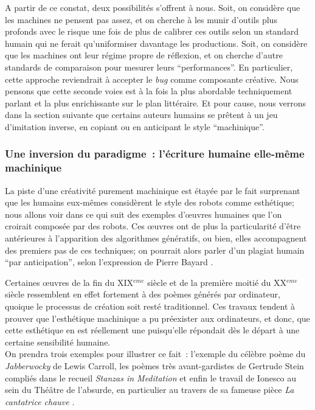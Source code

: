 \documentclass{article}
\begin{document}
					A partir de ce constat, deux possibilités s'offrent à nous. Soit, on considère que les machines ne pensent pas assez, et on cherche à les munir d'outils plus profonds avec le risque une fois de plus de calibrer ces outils selon un standard humain qui ne ferait qu'uniformiser davantage les productions. Soit, on considère que les machines ont leur régime propre de réflexion, et on cherche d'autre standards de comparaison pour mesurer leurs ``performances''. En particulier, cette approche reviendrait à accepter le \textit{bug} comme composante créative. Nous pensons que cette seconde voies est à la fois la plus abordable techniquement parlant et la plus enrichissante sur le plan littéraire. Et pour cause, nous verrons dans la section suivante que certains auteurs humains se prêtent à un jeu d'imitation inverse, en copiant ou en anticipant le style ``machinique''.
					
			\subsubsection{Une inversion du paradigme~: l'écriture humaine elle-même machinique} \label{inversion_paradigme}
				La piste d'une créativité purement machinique est étayée par le fait surprenant que les humains eux-mêmes considèrent le style des robots comme esthétique; nous allons voir dans ce qui suit des exemples d'œuvres humaines que l'on croirait composée par des robots. Ces œuvres ont de plus la particularité d'être antérieures à l'apparition des algorithmes génératifs, ou bien, elles accompagnent des premiers pas de ces techniques; on pourrait alors parler d'un plagiat humain ``par anticipation'', selon l'expression de Pierre Bayard \cite{bayard2002}.
				
				Certaines œuvres de la fin du XIX$^{eme}$ siècle et de la première moitié du XX$^{eme}$ siècle ressemblent en effet fortement à des poèmes générés par ordinateur, quoique le processus de création soit resté traditionnel. Ces travaux tendent à prouver que l'esthétique machinique a pu préexister aux ordinateurs, et donc, que cette esthétique en est réellement une puisqu'elle répondait dès le départ à une certaine sensibilité humaine.\\
				On prendra trois exemples pour illustrer ce fait~: l'exemple du célèbre poème du \textit{Jabberwocky} de Lewis Carroll, les poèmes très avant-gardistes de Gertrude Stein compliés dans le recueil \textit{Stanzas in Meditation} \cite{stein1932} et enfin le travail de Ionesco au sein du Théâtre de l'absurde, en particulier au travers de sa fameuse pièce \textit{La cantatrice chauve} \cite{ionesco1950}.\\
				
\end{document}
